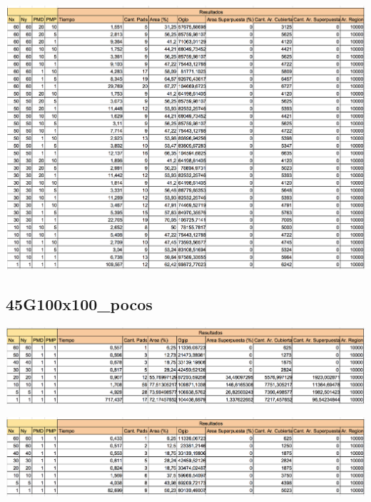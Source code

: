 \begin{center}
\includegraphics[width=1\textwidth]{imagenes/GML_0G100x100_pocos}
\end{center}

\subsection{45G100x100\_pocos}

\begin{center}
\includegraphics[width=1\textwidth]{imagenes/S_45G100x100_pocos}
\end{center}

\begin{center}
\includegraphics[width=1\textwidth]{imagenes/G_45G100x100_pocos}
\end{center}

